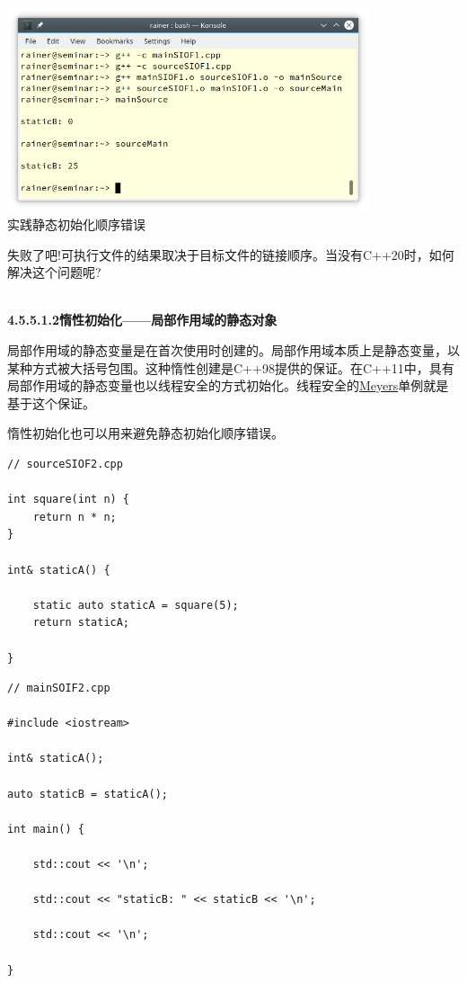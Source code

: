\begin{center}
\includegraphics[width=0.8\textwidth]{content/3/chapter4/images/37.png}\\
实践静态初始化顺序错误
\end{center}

失败了吧!可执行文件的结果取决于目标文件的链接顺序。当没有C++20时，如何解决这个问题呢?

\hspace*{\fill} \\ %
\noindent
\textbf{4.5.5.1.2\hspace{0.2cm}惰性初始化——局部作用域的静态对象}

局部作用域的静态变量是在首次使用时创建的。局部作用域本质上是静态变量，以某种方式被大括号包围。这种惰性创建是C++98提供的保证。在C++11中，具有局部作用域的静态变量也以线程安全的方式初始化。线程安全的\href{https://en.wikipedia.org/wiki/Scott_Meyers}{Meyers}单例就是基于这个保证。

惰性初始化也可以用来避免静态初始化顺序错误。

\begin{lstlisting}[style=styleCXX]
// sourceSIOF2.cpp

int square(int n) {
	return n * n;
}

int& staticA() {
	
	static auto staticA = square(5);
	return staticA;

}
\end{lstlisting}

\begin{lstlisting}[style=styleCXX]
// mainSOIF2.cpp

#include <iostream>

int& staticA();

auto staticB = staticA();

int main() {
	
	std::cout << '\n';
	
	std::cout << "staticB: " << staticB << '\n';
	
	std::cout << '\n';

}
\end{lstlisting}

